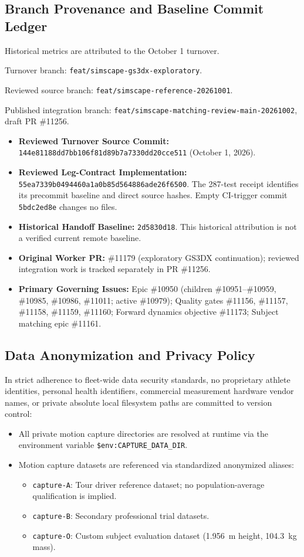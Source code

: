 \documentclass[11pt,a4paper]{article}
\begin{document}
\subsection{Branch Provenance and Baseline Commit Ledger}
Historical metrics are attributed to the October 1 turnover.\par
Turnover branch: \nolinkurl{feat/simscape-gs3dx-exploratory}.\par
Reviewed source branch: \nolinkurl{feat/simscape-reference-20261001}.\par
Published integration branch:
\nolinkurl{feat/simscape-matching-review-main-20261002}, draft PR \#11256.
\begin{itemize}
    \item \textbf{Reviewed Turnover Source Commit:} \texttt{144e81188dd7bb106f81d89b7a7330dd20cce511} (October 1, 2026).
    \item \textbf{Reviewed Leg-Contract Implementation:} \texttt{55ea7339b0494460a1a0b85d564886ade26f6500}. The 287-test receipt identifies its precommit baseline and direct source hashes. Empty CI-trigger commit \texttt{5bdc2ed8e} changes no files.
    \item \textbf{Historical Handoff Baseline:} \texttt{2d5830d18}. This historical attribution is not a verified current remote baseline.
    \item \textbf{Original Worker PR:} \#11179 (exploratory GS3DX continuation); reviewed integration work is tracked separately in PR \#11256.
    \item \textbf{Primary Governing Issues:} Epic \#10950 (children \#10951--\#10959, \#10985, \#10986, \#11011; active \#10979); Quality gates \#11156, \#11157, \#11158, \#11159, \#11160; Forward dynamics objective \#11173; Subject matching epic \#11161.
\end{itemize}

\subsection{Data Anonymization and Privacy Policy}
In strict adherence to fleet-wide data security standards, no proprietary athlete identities, personal health identifiers, commercial measurement hardware vendor names, or private absolute local filesystem paths are committed to version control:
\begin{itemize}
    \item All private motion capture directories are resolved at runtime via the environment variable \texttt{\$env:CAPTURE\_DATA\_DIR}.
    \item Motion capture datasets are referenced via standardized anonymized aliases:
    \begin{itemize}
        \item \texttt{capture-A}: Tour driver reference dataset; no population-average qualification is implied.
        \item \texttt{capture-B}: Secondary professional trial datasets.
        \item \texttt{capture-O}: Custom subject evaluation dataset (1.956~m height, 104.3~kg mass).
    \end{itemize}
\end{itemize}
\end{document}
